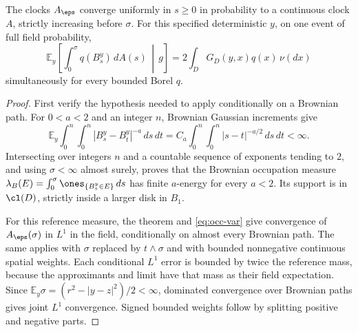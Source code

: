 \begin{lemma}\label{lem:occ-base}
The clocks $A_\eps$ converge uniformly in $s\geq0$ in probability to a
continuous clock $A$, strictly increasing before $\sigma$.
For this specified deterministic $y$, on one event of full field
probability,
\begin{equation}\label{eq:occ-base}
 \mathbb{E}_y\left[\int_0^\sigma q(B^y_s)\,dA(s)\,\middle|\,g\right]
       =2\int_DG_D(y,x)q(x)\,\nu(dx)
\end{equation}
simultaneously for every bounded Borel $q$.
\end{lemma}

\begin{proof}
First verify the hypothesis needed to apply \cite[Theorem 1.1,
p.~3]{berestycki2017elementary} conditionally on a Brownian path. For $0<a<2$ and an
integer $n$, Brownian Gaussian increments give
\[
 \mathbb{E}_y\int_0^n\int_0^n |B^y_s-B^y_t|^{-a}\,ds\,dt
   =C_a\int_0^n\int_0^n |s-t|^{-a/2}\,ds\,dt<\infty.
\]
Intersecting over integers $n$ and a countable sequence of exponents
tending to $2$, and using $\sigma<\infty$ almost surely, proves that
the Brownian occupation measure
$\lambda_B(E)=\int_0^\sigma\ones_{\{B^y_s\in E\}}\,ds$
has finite $a$-energy for every $a<2$. Its support is in $\cl(D)$,
strictly inside a larger disk in $B_1$.

For this reference measure, the theorem and \eqref{eq:occ-var} give
convergence of $A_\eps(\sigma)$ in $L^1$ in the field, conditionally
on almost every Brownian path. The same applies with $\sigma$ replaced
by $t\wedge\sigma$ and with bounded nonnegative continuous spatial
weights. Each conditional $L^1$ error is bounded by twice the reference
mass, because the approximants and limit have that mass as their
field expectation. Since
$\mathbb{E}_y\sigma=(r^2-|y-z|^2)/2<\infty$, dominated convergence over Brownian
paths gives joint $L^1$ convergence. Signed bounded weights follow by
splitting positive and negative parts.


\end{proof}
